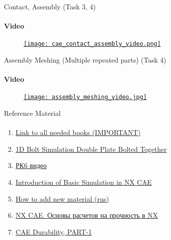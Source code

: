 \documentclass[aspectratio=169]{beamer}
\newcommand{\fbckg}[1]{\usebackgroundtemplate{\texttt{[image: \#1]}}}%
\begin{document}
\begin{frame}[t]{Contact, Assembly (Task 3, 4)}
    \framesubtitle{Video}
    \vspace{-0.6cm}
    \begin{figure}[H]
        \href{https://disk.yandex.ru/i/yfhUfCk8MthoIw}{
            \centering\texttt{[image: cae\_contact\_assembly\_video.png]}}
        \label{fig:cae_contact_assembly_video.png}
    \end{figure}
\end{frame}

\begin{frame}[t]{Assembly Meshing (Multiple repeated parts) (Task 4)}
    \framesubtitle{Video}
    \vspace{-0.6cm}
    \begin{figure}[H]
        \href{https://youtu.be/PCvw1kOc5oE}{
            \centering\texttt{[image: assembly\_meshing\_video.jpg]}}
        \label{fig:assembly_meshing_video.jpg}
    \end{figure}
\end{frame}

\begin{frame}[t]{Reference Material}
    \framesubtitle{}
    \begin{enumerate}
        \item \href{https://disk.yandex.ru/d/Q6H7la7iLdeh5Q}{Link to all needed books (IMPORTANT)}
        \item \href{https://youtu.be/vBilPNT2POM}{1D Bolt Simulation Double Plate Bolted Together}
        \item \href{https://youtu.be/-iTcEE67jYc}{РК6 видео}
        \item \href{https://youtu.be/xqBRiOuGGfw}{Introduction of Basic Simulation in NX CAE}
        \item \href{https://youtu.be/e0mKgo4m-kk}{How to add new material (rus)}
        \item \href{https://www.youtube.com/playlist?list=PLrlbZU2HDT4n-BPs-EW9x2PCWBDqmRi5H}{NX CAE. Основы расчетов на прочность в NX}
        \item \href{https://youtu.be/1jJtZCUNQNo}{CAE Durability, PART-1}
    \end{enumerate}
    \end{frame}

\fbckg{fibeamer/figs/last_page.png}
\frame[plain]{}
\end{document}
